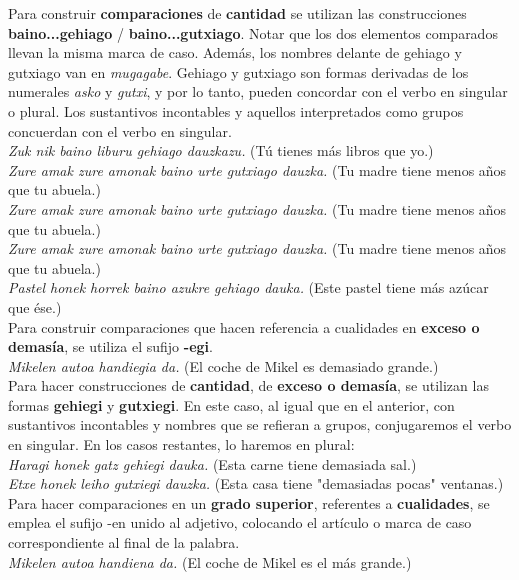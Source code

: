 \documentclass[11pt, a4paper]{article}
\begin{document}
\noindent Para construir \textbf{comparaciones} de \textbf{cantidad} se utilizan las construcciones \textbf{baino...gehiago} / \textbf{baino...gutxiago}. Notar que los dos elementos comparados llevan la misma marca de caso. Adem\'as, los nombres delante de gehiago y gutxiago van en \textit{mugagabe}. Gehiago y gutxiago son formas derivadas de los numerales \textit{asko} y \textit{gutxi}, y por lo tanto, pueden concordar con el verbo en singular o plural. Los sustantivos incontables y aquellos interpretados como grupos concuerdan con el verbo en singular.\\
\indent \textit{Zuk nik baino liburu gehiago dauzkazu.}
(Tú tienes más libros que yo.)\\
\indent \textit{Zure amak zure amonak baino urte gutxiago dauzka.}
(Tu madre tiene menos años que tu abuela.)\\
\indent \textit{Zure amak zure amonak baino urte gutxiago dauzka.}
(Tu madre tiene menos años que tu abuela.)\\
\indent \textit{Zure amak zure amonak baino urte gutxiago dauzka.}
(Tu madre tiene menos años que tu abuela.)\\
\indent \textit{Pastel honek horrek baino azukre gehiago dauka.}
(Este pastel tiene más azúcar que ése.)\\

\noindent Para construir comparaciones que hacen referencia a cualidades en \textbf{exceso o demas\'ia}, se utiliza el sufijo \textbf{-egi}.\\
\indent \textit{Mikelen autoa handiegia da.}
(El coche de Mikel es demasiado grande.)\\

\noindent Para hacer construcciones de \textbf{cantidad}, de \textbf{exceso o demas\'ia}, se utilizan las formas \textbf{gehiegi} y \textbf{gutxiegi}. En este caso, al igual que en el anterior, con sustantivos incontables y nombres que se refieran a grupos, conjugaremos el verbo en singular. En los casos restantes, lo haremos en plural:\\
\indent \textit{Haragi honek gatz gehiegi dauka.}
(Esta carne tiene demasiada sal.)\\
\indent \textit{Etxe honek leiho gutxiegi dauzka.}
(Esta casa tiene "demasiadas pocas" ventanas.)\\

\noindent Para hacer comparaciones en un \textbf{grado superior}, referentes a \textbf{cualidades}, se emplea el sufijo -en unido al adjetivo, colocando el artículo o marca de caso correspondiente al final de la palabra.\\
\indent \textit{Mikelen autoa handiena da.}
(El coche de Mikel es el más grande.)\\
\end{document}
